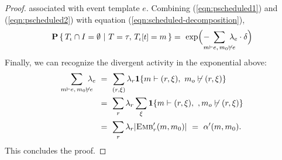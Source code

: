 \begin{proof}
  associated with event template $e$.
  Combining (\ref{eqn:pscheduled1}) and (\ref{eqn:pscheduled2}) with
  equation (\ref{eqn:scheduled-decomposition}),
  \begin{equation*}
    \CProb{ \ATRAJ{} \cap I = \emptyset }
    { T=\tau,\,\TSTATE{t}{\ATRAJ{}} = m }
    = \ 
    \exp{ \! \Big ( \!- \hspace{-1em} \sum_{m \vdash e, \, m_0 \not\vdash
        e} \hspace{-0.9em} \lambda_e \cdot \delta \Big ) }
  \end{equation*}
  Finally, we can recognize the divergent activity in the exponential
  above: \vskip 0.0cm
  \begin{equation*}
    \begin{aligned}
      \sum_{m \vdash e, \, m_0 \not\vdash e} \hspace{-0.8em} \lambda_e
      \
      &= \ \sum_{(r, \xi)} \lambda_r \textbf{1}\{ m \vdash (r, \xi),\ m_o \not\vdash (r, \xi) \} \\
      &= \ \sum_r \lambda_r\sum_\xi \textbf{1}\{ m \vdash (r, \xi),\ ,m_o \not\vdash (r, \xi) \} \\
      &= \ \sum_r \lambda_r |{\textsc{Emb}}'_{r}(m, m_0)| \ = \ \alpha'(m, m_0).
    \end{aligned}
  \end{equation*}
  \vskip 0.2cm
  \noindent This concludes the proof.
\end{proof}
